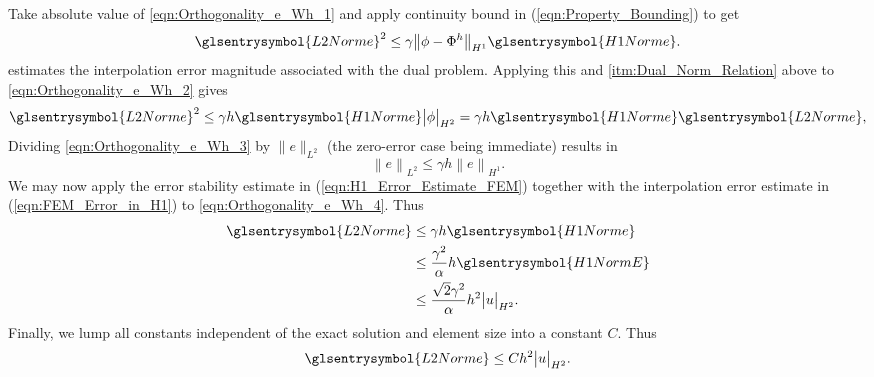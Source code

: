 Take absolute value of \cref{eqn:Orthogonality_e_Wh_1} and apply continuity bound in (\ref{eqn:Property_Bounding}) to get
\begin{equation}	\label{eqn:Orthogonality_e_Wh_2}
	\glsentrysymbol{L2Norme}^2 \leq \gamma \big\| \phi - \Phi^h \big\|_{H^1} \glsentrysymbol{H1Norme}.
\end{equation}
 estimates the interpolation error magnitude associated with the dual problem. Applying this and
\cref{itm:Dual_Norm_Relation} above to \cref{eqn:Orthogonality_e_Wh_2} gives
\begin{equation}	\label{eqn:Orthogonality_e_Wh_3}
	\glsentrysymbol{L2Norme}^2 \leq \gamma h \glsentrysymbol{H1Norme} \big \vert \phi \big \vert_{H^2} =
		\gamma h \glsentrysymbol{H1Norme} \glsentrysymbol{L2Norme},
\end{equation}
Dividing \cref{eqn:Orthogonality_e_Wh_3} by $\|e\|_{L^2}$ (the zero-error case being immediate) results in
\begin{equation}	\label{eqn:Orthogonality_e_Wh_4}
	\left\| e \right\|_{L^2} \leq \gamma h \left\| e \right\|_{H^1}.
\end{equation}
We may now apply the error stability estimate in (\ref{eqn:H1_Error_Estimate_FEM}) together with the interpolation error estimate
in (\ref{eqn:FEM_Error_in_H1}) to \cref{eqn:Orthogonality_e_Wh_4}. Thus
\begin{equation}	\label{eqn:FEM_Error_To_h_And_Exact_Sol_1}
	\begin{aligned}
		\glsentrysymbol{L2Norme} &\leq \gamma h \glsentrysymbol{H1Norme} \\
		&\leq \frac{ \gamma^2 }{ \alpha } h \glsentrysymbol{H1NormE}	\\
		&\leq \frac{ \sqrt{2} \gamma^2 }{ \alpha } h^2 \big \vert u \big \vert_{ H^2 }.
	\end{aligned}
\end{equation}
Finally, we lump all constants independent of the exact solution and element size into a constant $C$. Thus
\begin{equation}	\label{eqn:FEM_Error_To_h_And_Exact_Sol}
	\glsentrysymbol{L2Norme} \leq C h^2 \big \vert u \big \vert_{ H^2 }.
\end{equation}
%